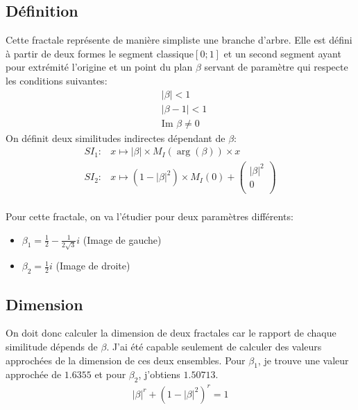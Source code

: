 \documentclass[a4paper, 12pt]{report}
\begin{document}
			\subsection{Définition}
				Cette fractale représente de manière simpliste une branche d'arbre. Elle est défini à partir de deux formes le segment classique$[0;1]$ et un second segment ayant pour extrémité l'origine et un point du plan $\beta$ servant de paramètre qui respecte les  conditions suivantes:
				\begin{align*}
					&\left|\beta\right|<1\\
					&\left|\beta-1\right|<1\\
					&\textrm{Im }\beta\neq0
				\end{align*}
				On définit deux similitudes indirectes dépendant de $\beta$:
				\begin{align*}
					SI_1: &x\mapsto \left|\beta\right|\times M_I(\arg(\beta))\times x \\
					SI_2: &x\mapsto(1-\left|\beta\right|^2)\times M_I(0)+ 	\left(\begin{array}{ccc}
																				\left|\beta\right|^2\\
																				0\\
																			\end{array}\right)\\
				\end{align*}
				
				Pour cette fractale, on va l’étudier pour deux paramètres différents:
				\begin{itemize}
					\item $\beta_1=\frac{1}{2}-\frac{1}{2\sqrt{3}}i$ (Image de gauche)
					\item $\beta_2=\frac{1}{2}i$ (Image de droite)
				\end{itemize}
			\subsection{Dimension}
				On doit donc calculer la dimension de deux fractales car le rapport de chaque similitude dépends de $\beta$. J'ai été capable seulement de calculer des valeurs approchées de la dimension de ces deux ensembles.
				Pour $\beta_1$, je trouve une valeur approchée de $1.6355$ et pour $\beta_2$, j'obtiens $1.50713$.
				\begin{align*}
					\left|\beta\right|^r+\left(1-\left|\beta\right|^2\right)^r=1
				\end{align*}
\end{document}
